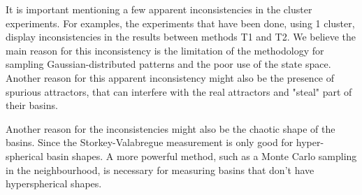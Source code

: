 It is important mentioning a few apparent inconsistencies in the cluster experiments. For examples, the experiments that have been done, using 1 cluster, display inconsistencies in the results between methods T1 and T2. We believe the main reason for this inconsistency is the limitation of the methodology for sampling Gaussian-distributed patterns and the poor use of the state space. Another reason for this apparent inconsistency might also be the presence of spurious attractors, that can interfere with the real attractors and "steal" part of their basins.

Another reason for the inconsistencies might also be the chaotic shape of the basins. Since the Storkey-Valabregue measurement is only good for hyper-spherical basin shapes. A more powerful method, such as a Monte Carlo sampling in the neighbourhood, is necessary for measuring basins that don't have hyperspherical shapes. 